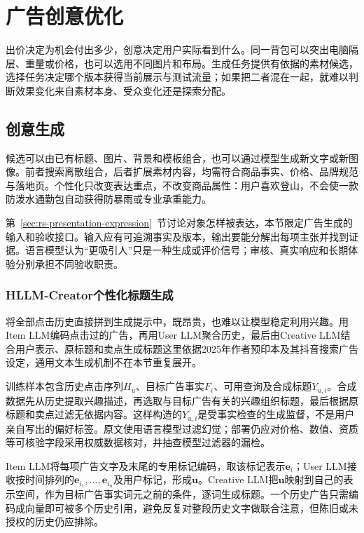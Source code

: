 \section{广告创意优化}
\label{sec:rs-advertising-creative}

出价决定为机会付出多少，创意决定用户实际看到什么。同一背包可以突出电脑隔层、重量或价格，也可以选用不同图片和布局。生成任务提供有依据的素材候选，选择任务决定哪个版本获得当前展示与测试流量；如果把二者混在一起，就难以判断效果变化来自素材本身、受众变化还是探索分配。

\subsection{创意生成}
\label{sec:rs-advertising-creative-generation}

候选可以由已有标题、图片、背景和模板组合，也可以通过模型生成新文字或新图像。前者搜索离散组合，后者扩展素材内容，均需符合商品事实、价格、品牌规范与落地页。个性化只改变表达重点，不改变商品属性：用户喜欢登山，不会使一款防泼水通勤包自动获得防暴雨或专业承重能力。

第~\ref{sec:rs-presentation-expression}~节讨论对象怎样被表达，本节限定广告生成的输入和验收接口。输入应有可追溯事实及版本，输出要能分解出每项主张并找到证据。语言模型认为“更吸引人”只是一种生成或评价信号；审核、真实响应和长期体验分别承担不同验收职责。

\subsubsection{HLLM-Creator个性化标题生成}
\label{sec:rs-advertising-hllm-creator}

将全部点击历史直接拼到生成提示中，既昂贵，也难以让模型稳定利用兴趣。用Item LLM编码点击过的广告，再用User LLM聚合历史，最后由Creative LLM结合用户表示、原标题和卖点生成标题这里依据2025年作者预印本及其抖音搜索广告设定，通用文本生成机制不在本节重复展开。

训练样本包含历史点击序列$H_u$、目标广告事实$F_i$、可用查询及合成标题$Y_{u,i}$。合成数据先从历史提取兴趣描述，再选取与目标广告有关的兴趣组织标题，最后根据原标题和卖点过滤无依据内容。这样构造的$Y_{u,i}$是受事实检查的生成监督，不是用户亲自写出的偏好标签。原文使用语言模型过滤幻觉；部署仍应对价格、数值、资质等可核验字段采用权威数据核对，并抽查模型过滤器的漏检。

Item LLM将每项广告文字及末尾的专用标记编码，取该标记表示$\bm{e}_i$；User LLM接收按时间排列的$\bm{e}_{i_1},\ldots,\bm{e}_{i_n}$及用户标记，形成$\bm{u}$。Creative LLM把$\bm{u}$映射到自己的表示空间，作为目标广告事实词元之前的条件，逐词生成标题。一个历史广告只需编码成向量即可被多个历史引用，避免反复对整段历史文字做联合注意，但陈旧或未授权的历史仍应排除。

